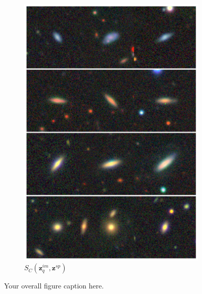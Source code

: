 \documentclass[a4paper,12pt]{article}
\begin{document}
\begin{figure}[H]
\begin{subfigure}{0.22\textwidth}
        \includegraphics[height=0.21\textheight]{../figures/images_sp_im.png}
        \caption{$S_C(\mathbf{z}_q^{im}, \mathbf{z}^{sp})$}
        \label{fig:retrieval_5}
    \end{subfigure}
    \caption{Your overall figure caption here.}
    \label{fig:retrieval}
\end{figure}
\end{document}
